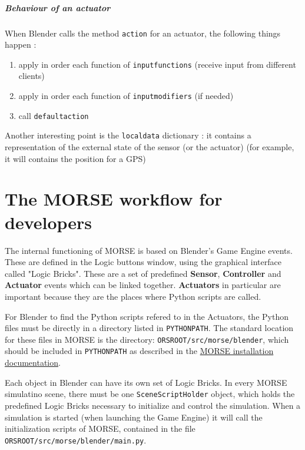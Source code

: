 \documentclass[twoside,a4paper,10pt]{report}
\newcommand{\dokutitlelevelone}[1]{\chapter{#1}}
\newcommand{\dokutitlelevelfive}[1]{\paragraph{#1}}
\newcommand{\dokubold}[1]{\textbf{#1}}
\newcommand{\dokumonospace}[1]{\texttt{#1}}
\newcommand{\dokuitem}{\item}
\begin{document}
\dokutitlelevelfive{Behaviour of an actuator}

When Blender calls the method \dokumonospace{action} for an actuator, the following things
happen :


\begin{enumerate}\dokuitem  apply in order each function of \dokumonospace{input{\textunderscore}functions} (receive input from different clients)
\dokuitem  apply in order each function of \dokumonospace{input{\textunderscore}modifiers} (if needed)
\dokuitem  call \dokumonospace{default{\textunderscore}action}
\end{enumerate}

Another interesting point is the \dokumonospace{local{\textunderscore}data} dictionary : it contains a
representation of the external state of the sensor (or the actuator) (for
example, it will contains the position for a GPS)

\dokutitlelevelone{The MORSE workflow for developers}
\label{e94f34704efddc910497ce79fd4576f3}%
\label{8e26c06a643302a6445b3bace01e145d}%

The internal functioning of MORSE is based on Blender's Game Engine events.
These are defined in the Logic buttons window, using the graphical interface called "Logic Bricks". These are a set of predefined \dokubold{Sensor}, \dokubold{Controller} and \dokubold{Actuator} events which can be linked together.
\dokubold{Actuators} in particular are important because they are the places where Python scripts are called.

For Blender to find the Python scripts refered to in the Actuators, the Python files must be directly in a directory listed in \dokumonospace{PYTHONPATH}. The standard location for these files in MORSE is the directory: \dokumonospace{ORS{\textunderscore}ROOT/src/morse/blender}, which should be included in \dokumonospace{PYTHONPATH} as described in the \hyperref[ea09bb364ef1bffd889e76b7a59035fc]{ MORSE installation documentation}.

Each object in Blender can have its own set of Logic Bricks. In every MORSE simulatino scene, there must be one \dokumonospace{Scene{\textunderscore}Script{\textunderscore}Holder} object, which holds the predefined Logic Bricks necessary to initialize and control the simulation.
When a simulation is started (when launching the Game Engine) it will call the initialization scripts of MORSE, contained in the file \dokumonospace{{\textdollar}ORS{\textunderscore}ROOT/src/morse/blender/main.py}.
\end{document}
